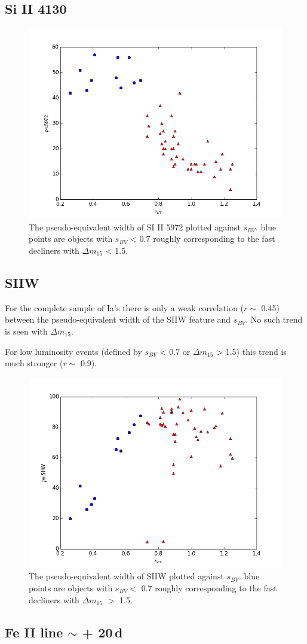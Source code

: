 \documentclass{article}
\begin{document}
\subsection{Si II 4130}
\begin{figure}
\includegraphics[width=.7\textwidth, trim= 0 30 0 30]{../img/pw5972_sbv.png}
\caption{The pseudo-equivalent width of SI II 5972 plotted against $s_{BV}$. blue points are objects with $s_{BV}$ < 0.7 roughly corresponding to the fast decliners with $\Delta m_{15}$ < 1.5. }
\end{figure} 

\subsection{SIIW }
For the complete sample of Ia's there is only a weak correlation ($r \sim$ 0.45) between the pseudo-equivalent width of the SIIW feature and $s_{BV}$. No such trend is seen with $\Delta m_{15}$.

For low luminosity events (defined by $s_{BV}$ < 0.7 or $\Delta m_{15}$ > 1.5) this trend is much stronger ($r \sim$ 0.9). 

\begin{figure}
\includegraphics[width=.7\textwidth, trim= 0 30 0 30]{../img/pwSIIw_sbv.png}
\caption{The pseudo-equivalent width of SIIW plotted against $s_{BV}$. blue points are objects with $s_{BV} <$ 0.7 roughly corresponding to the fast decliners with $\Delta m_{15}$ $>$ 1.5. }
\end{figure} 


\subsection{Fe II line $\sim$ + 20\,d}
\end{document}

